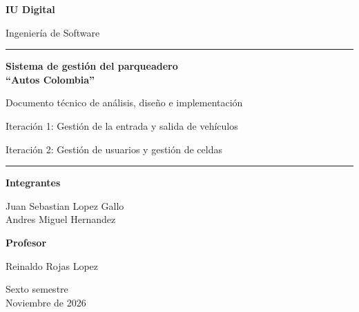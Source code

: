\begin{titlepage}
\centering
\vspace*{1cm}
{\Large\bfseries IU Digital\par}
\vspace{0.4cm}
{\large Ingeniería de Software\par}
\vspace{2.5cm}
{\color{azul}\rule{\textwidth}{1.5pt}\par}
\vspace{0.4cm}
{\Huge\bfseries Sistema de gestión del parqueadero\\[0.3cm] ``Autos Colombia''\par}
\vspace{0.4cm}
{\Large Documento técnico de análisis, diseño e implementación\par}
\vspace{0.2cm}
{\large Iteración 1: Gestión de la entrada y salida de vehículos\par}
{\large Iteración 2: Gestión de usuarios y gestión de celdas\par}
{\color{azul}\rule{\textwidth}{1.5pt}\par}
\vspace{2.5cm}
{\large\bfseries Integrantes\par}
\vspace{0.2cm}
{\large Juan Sebastian Lopez Gallo\\ Andres Miguel Hernandez\par}
\vspace{1.2cm}
{\large\bfseries Profesor\par}
\vspace{0.2cm}
{\large Reinaldo Rojas Lopez\par}
\vfill
{\large Sexto semestre\\ Noviembre de 2026\par}
\end{titlepage}
